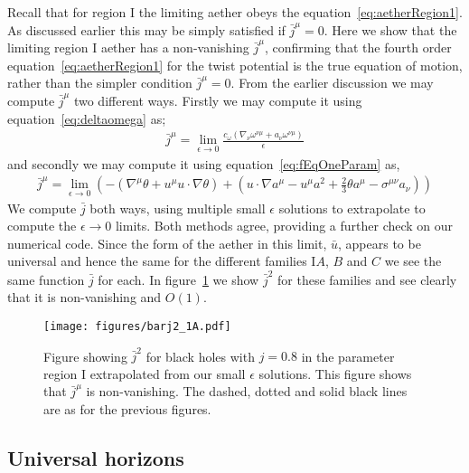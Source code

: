 \documentclass[12pt]{article}
\numberwithin{equation}{section}
\begin{document}
Recall that for region I the limiting aether obeys the equation~\eqref{eq:aetherRegion1}. As discussed earlier this may be simply satisfied if $\bar{j}^\mu = 0$. Here we show that the limiting region I aether has a non-vanishing $\bar{j}^\mu$, confirming that the fourth order equation~\eqref{eq:aetherRegion1} for the twist potential is the true equation of motion, rather than the simpler condition $\bar{j}^\mu = 0$. 
From the earlier discussion we may compute $\bar{j}^\mu$ two different ways. Firstly we may compute it using equation~\eqref{eq:deltaomega} as;
\begin{eqnarray}
\bar{j}^\mu = \lim_{\epsilon \to 0}  \frac{ c_\omega \left( {\nabla}_\nu \omega^{\nu\mu} +  {a}_\nu \omega^{\nu\mu}   \right) }{\epsilon}
\end{eqnarray}
and secondly we may compute it using equation~\eqref{eq:fEqOneParam} as,
\begin{eqnarray}
 \bar{j}^\mu  = \lim_{\epsilon \to 0} \left(
 -
\left( {\nabla}^\mu {\theta} +  {u}^\mu {u} \cdot {\nabla} {\theta} \right) +  \left( {u} \cdot {\nabla} {a}^\mu - {u}^\mu {a}^2 + \frac{2}{3} {\theta} {a}^\mu  -  {\sigma}^{\mu\nu} {a}_\nu  \right)   \right)
\end{eqnarray}
We compute $\bar{j}$ both ways, using multiple small $\epsilon$ solutions to extrapolate to compute the   $\epsilon \to 0$ limits. Both methods agree, providing a further check on our numerical code. Since the form of the aether in this limit, $\bar{u}$, appears to be universal and hence the same for the different families I$A$, $B$ and $C$ we see the same function $\bar{j}$ for each. In figure~\ref{fig:barj2} we show $\bar{j}^2$ for these families and see clearly that it is non-vanishing and $O(1)$.


\begin{figure}
\centerline{  
  \texttt{[image: figures/barj2\_1A.pdf]}
  }
  \caption{\label{fig:barj2}
  Figure showing $\bar j^2$ for black holes with $j=0.8$ in the parameter region I extrapolated from our small $\epsilon$ solutions. This figure shows that $\bar j^\mu$ is non-vanishing. The dashed, dotted and solid black lines are as for the previous figures. 
  }
\end{figure}



\subsection{Universal horizons}
\end{document}
